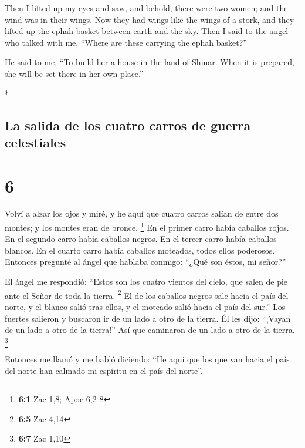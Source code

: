 \begin{paracol}{2}
\begin{otherlanguage}{english}
 Then I lifted up my eyes and saw, and behold, there were
two women; and the wind was in their wings. Now they had wings like the
wings of a stork, and they lifted up the ephah basket between earth and
the sky.  Then I said to the angel who talked with me,
``Where are these carrying the ephah basket?''

 He said to me, ``To build her a house in the land of
Shinar. When it is prepared, she will be set there in her own place.''

\end{otherlanguage}

\switchcolumn[0]*

\hypertarget{la-salida-de-los-cuatro-carros-de-guerra-celestiales}{%
\subsection{La salida de los cuatro carros de guerra
celestiales}\label{la-salida-de-los-cuatro-carros-de-guerra-celestiales}}

\hypertarget{section-10}{%
\section{6}\label{section-10}}

 Volví a alzar los ojos y miré, y he aquí que cuatro
carros salían de entre dos montes; y los montes eran de bronce.
\footnote{\textbf{6:1} Zac 1,8; Apoc 6,2-8}  En el primer
carro había caballos rojos. En el segundo carro había caballos negros.
 En el tercer carro había caballos blancos. En el cuarto
carro había caballos moteados, todos ellos poderosos. 
Entonces pregunté al ángel que hablaba conmigo: ``¿Qué son éstos, mi
señor?''

 El ángel me respondió: ``Estos son los cuatro vientos del
cielo, que salen de pie ante el Señor de toda la tierra. \footnote{\textbf{6:5}
  Zac 4,14}  El de los caballos negros sale hacia el país
del norte, y el blanco salió tras ellos, y el moteado salió hacia el
país del sur.''  Los fuertes salieron y buscaron ir de un
lado a otro de la tierra. Él les dijo: ``¡Vayan de un lado a otro de la
tierra!'' Así que caminaron de un lado a otro de la tierra. \footnote{\textbf{6:7}
  Zac 1,10}

 Entonces me llamó y me habló diciendo: ``He aquí que los
que van hacia el país del norte han calmado mi espíritu en el país del
norte''.


\end{paracol}
